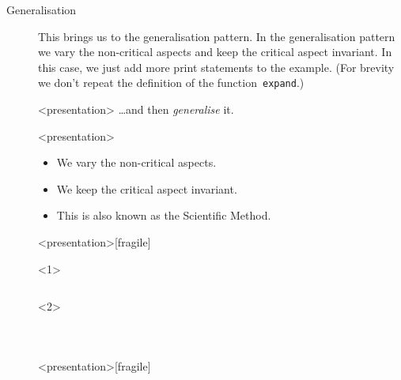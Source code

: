 \begin{description}
  \item[Generalisation] This brings us to the generalisation pattern.
    In the generalisation pattern we vary the non-critical aspects and keep the 
    critical aspect invariant.
    In this case, we just add more print statements to the example.
    (For brevity we don't repeat the definition of the 
    function~\texttt{expand}.)

    \begin{frame}<presentation>
      \dots and then \emph{generalise} it.
    \end{frame}

    \begin{frame}<presentation>
      \begin{remark}[Generalisation]
        \begin{itemize}
          \item We vary the non-critical aspects.
          \item We keep the critical aspect invariant.
            \pause
          \item \alert<3>{This is also known as the Scientific Method.}
        \end{itemize}
      \end{remark}
    \end{frame}

    \begin{frame}<presentation>[fragile]
      \begin{example}[experiment2.py]
        \begin{onlyenv}<1>
          \inputminted[firstline=1,lastline=13]{python}{examples/experiment2.py}
        \end{onlyenv}
        \begin{onlyenv}<2>
          \inputminted[firstline=1,lastline=2]{python}{examples/experiment2.py}
          \inputminted[firstline=9,lastline=10]{python}{examples/experiment2.py}
          \inputminted[firstline=14]{python}{examples/experiment2.py}
        \end{onlyenv}
      \end{example}
    \end{frame}

    \begin{frame}<presentation>[fragile]
      \begin{example}[experiment3.py]
      \inputminted{python}{examples/experiment3.py}
      \end{example}
    \end{frame}


\end{description}
